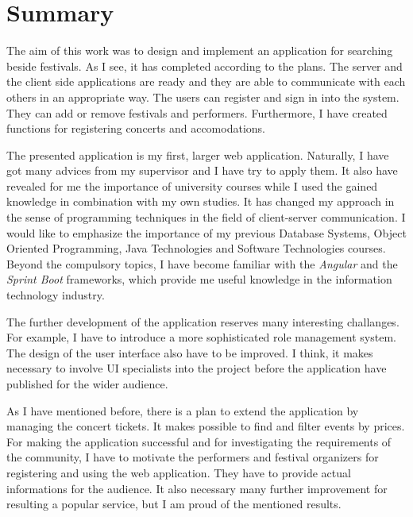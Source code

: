 \newpage

\section*{Summary}

The aim of this work was to design and implement an application for searching beside festivals. As I see, it has completed according to the plans. The server and the client side applications are ready and they are able to communicate with each others in an appropriate way. The users can register and sign in into the system. They can add or remove festivals and performers. Furthermore, I have created functions for registering concerts and accomodations.

The presented application is my first, larger web application. Naturally, I have got many advices from my supervisor and I have try to apply them. It also have revealed for me the importance of university courses while I used the gained knowledge in combination with my own studies. It has changed my approach in the sense of programming techniques in the field of client-server communication. I would like to emphasize the importance of my previous Database Systems, Object Oriented Programming, Java Technologies and Software Technologies courses. Beyond the compulsory topics, I have become familiar with the \textit{Angular} and the \textit{Sprint Boot} frameworks, which provide me useful knowledge in the information technology industry.

The further development of the application reserves many interesting challanges. For example, I have to introduce a more sophisticated role management system. The design of the user interface also have to be improved. I think, it makes necessary to involve UI specialists into the project before the application have published for the wider audience.

As I have mentioned before, there is a plan to extend the application by managing the concert tickets. It makes possible to find and filter events by prices. For making the application successful and for investigating the requirements of the community, I have to motivate the performers and festival organizers for registering and using the web application. They have to provide actual informations for the audience. It also necessary many further improvement for resulting a popular service, but I am proud of the mentioned results.
